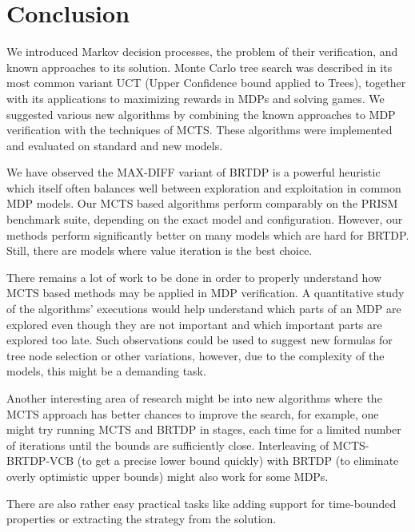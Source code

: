 \chapter{Conclusion}

We introduced Markov decision processes, the problem of their
verification, and known approaches to its solution.  Monte Carlo tree
search was described in its most common variant UCT (Upper Confidence
bound applied to Trees), together with its applications to maximizing
rewards in MDPs and solving games.
We suggested various new algorithms by combining the known
approaches to MDP verification with the techniques of MCTS. These
algorithms were implemented and evaluated on standard and new models.

We have observed the MAX-DIFF variant of BRTDP is a powerful
heuristic which itself often balances well between exploration and
exploitation in common MDP models.
Our MCTS based algorithms perform comparably on the PRISM
benchmark suite, depending on the exact model and configuration.
However, our methods perform significantly better on many models
which are hard for BRTDP. Still, there are models where value iteration
is the best choice.

There remains a lot of work to be done in order to properly understand
how MCTS based methods may be applied in MDP verification. A
quantitative study of the algorithms' executions would help understand
which parts
of an MDP are explored even though they are not important and which
important parts are explored too late. Such observations could be used
to suggest new formulas for tree node selection or other variations,
however, due to the complexity of the models, this might be a demanding task.

Another interesting area of research might be into
new algorithms where the MCTS approach has better chances to
improve the search, for example, one might try running MCTS and BRTDP in
stages, each time for a limited number of iterations until the bounds
are sufficiently close. Interleaving of MCTS-BRTDP-VCB (to get a precise
lower bound quickly) with BRTDP (to eliminate overly optimistic upper
bounds) might also work for some MDPs.

There are also rather easy practical tasks like adding support for
time-bounded properties or extracting the strategy from the solution.
